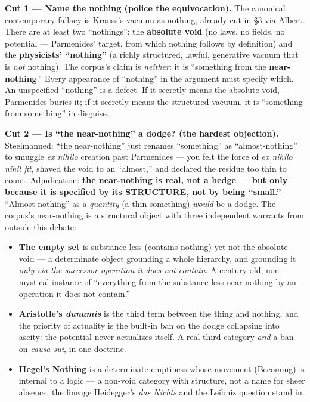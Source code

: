 \documentclass[11pt]{article}
\begin{document}
\textbf{Cut 1 — Name the nothing (police the equivocation).} The canonical contemporary fallacy is Krauss's vacuum-as-nothing, already cut in §3 via Albert. There are at least two ``nothings'': the \textbf{absolute void} (no laws, no fields, no potential — Parmenides' target, from which nothing follows by definition) and the \textbf{physicists' ``nothing''} (a richly structured, lawful, generative vacuum that is \emph{not} nothing). The corpus's claim is \emph{neither}: it is ``something from the \textbf{near-nothing}.'' Every appearance of ``nothing'' in the argument must specify which. An unspecified ``nothing'' is a defect. If it secretly means the absolute void, Parmenides buries it; if it secretly means the structured vacuum, it is ``something from something'' in disguise.

\textbf{Cut 2 — Is ``the near-nothing'' a dodge? (the hardest objection).} Steelmanned: ``the near-nothing'' just renames ``something'' as ``almost-nothing'' to smuggle \emph{ex nihilo} creation past Parmenides — you felt the force of \emph{ex nihilo nihil fit}, shaved the void to an ``almost,'' and declared the residue too thin to count. Adjudication: \textbf{the near-nothing is real, not a hedge — but only because it is specified by its STRUCTURE, not by being ``small.''} ``Almost-nothing'' as a \emph{quantity} (a thin something) \emph{would} be a dodge. The corpus's near-nothing is a structural object with three independent warrants from outside this debate:

\begin{itemize}
\item \textbf{The empty set} is substance-less (contains nothing) yet not the absolute void — a determinate object grounding a whole hierarchy, and grounding it \emph{only via the successor operation it does not contain}. A century-old, non-mystical instance of ``everything from the substance-less near-nothing by an operation it does not contain.''
\item \textbf{Aristotle's \emph{dunamis}} is the third term between the thing and nothing, and the priority of actuality is the built-in ban on the dodge collapsing into aseity: the potential never actualizes itself. A real third category \emph{and} a ban on \emph{causa sui}, in one doctrine.
\item \textbf{Hegel's Nothing} is a determinate emptiness whose movement (Becoming) is internal to a logic — a non-void category with structure, not a name for sheer absence; the lineage Heidegger's \emph{das Nichts} and the Leibniz question stand in.
\end{itemize}
\end{document}
